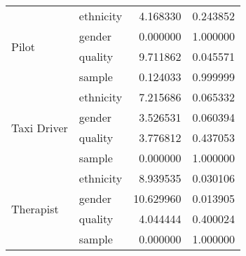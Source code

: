 \begin{tabular}{llrr}
\cline{1-4}
\multirow[t]{4}{*}{Pilot  } & ethnicity & 4.168330 & 0.243852 \\
 & gender & 0.000000 & 1.000000 \\
 & quality & 9.711862 & 0.045571 \\
 & sample & 0.124033 & 0.999999 \\
\cline{1-4}
\multirow[t]{4}{*}{Taxi Driver } & ethnicity & 7.215686 & 0.065332 \\
 & gender & 3.526531 & 0.060394 \\
 & quality & 3.776812 & 0.437053 \\
 & sample & 0.000000 & 1.000000 \\
\cline{1-4}
\multirow[t]{4}{*}{Therapist } & ethnicity & 8.939535 & 0.030106 \\
 & gender & 10.629960 & 0.013905 \\
 & quality & 4.044444 & 0.400024 \\
 & sample & 0.000000 & 1.000000 \\
\cline{1-4}
\bottomrule
\end{tabular}
